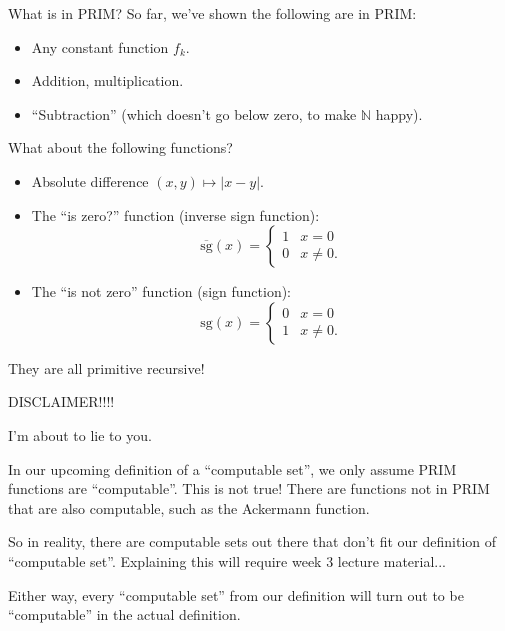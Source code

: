 \documentclass{beamer}
\newcommand{\N}{\mathbb N}
\begin{document}
\begin{frame}{What is in PRIM?}
So far, we've shown the following are in PRIM:
\begin{itemize}
    \item Any constant function $f_k$.
    \item Addition, multiplication.
    \item ``Subtraction'' (which doesn't go below zero, to make $\N$ happy).
\end{itemize}
\pause
What about the following functions?
\begin{itemize}
    \item Absolute difference $(x, y) \mapsto |x - y|$. \pause
    \item The ``is zero?'' function (inverse sign function): $$\overline{\mathrm{sg}}(x) = \begin{cases}
    1 & x = 0\\
    0 & x \neq 0.
    \end{cases}$$\pause
    \item The ``is not zero'' function (sign function): 
    $$\mathrm{sg}(x) = \begin{cases}
    0 & x = 0\\
    1 & x \neq 0.
    \end{cases}$$\pause
\end{itemize}
They are all primitive recursive!

\end{frame}

\begin{frame}{\color{red}DISCLAIMER!!!!}

I'm about to lie to you.

\color{red}

In our upcoming definition of a ``computable set'', we only assume PRIM functions are ``computable''. This is not true! There are functions not in PRIM that are also computable, such as the Ackermann function.

\pause

So in reality, there are computable sets out there that don't fit our definition of ``computable set''. Explaining this will require week 3 lecture material...

\pause

Either way, every ``computable set'' from our definition will turn out to be ``computable'' in the actual definition.

\end{frame}
\end{document}
